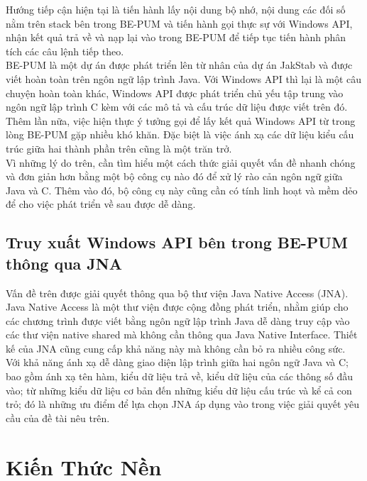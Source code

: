 \documentclass[14pt]{hcmutarticle}
\begin{document}
Hướng tiếp cận hiện tại là tiến hành lấy nội dung bộ nhớ, nội dung các đối số nằm trên stack bên trong BE-PUM và tiến hành gọi thực sự với Windows API, nhận kết quả trả về và nạp lại vào trong BE-PUM để tiếp tục tiến hành phân tích các câu lệnh tiếp theo.\\

BE-PUM là một dự án được phát triển lên từ nhân của dự án JakStab và được viết hoàn toàn trên ngôn ngữ lập trình Java. Với Windows API thì lại là một câu chuyện hoàn toàn khác, Windows API được phát triển chủ yếu tập trung vào ngôn ngữ lập trình C kèm với các mô tả và cấu trúc dữ liệu được viết trên đó. Thêm lần nữa, việc hiện thực ý tưởng gọi để lấy kết quả Windows API từ trong lòng BE-PUM gặp nhiều khó khăn. Đặc biệt là việc ánh xạ các dữ liệu kiểu cấu trúc giữa hai thành phần trên cũng là một trăn trở.\\

Vì những lý do trên, cần tìm hiểu một cách thức giải quyết vấn đề nhanh chóng và đơn giản hơn bằng một bộ công cụ nào đó để xử lý rào cản ngôn ngữ giữa Java và C. Thêm vào đó, bộ công cụ này cũng cần có tính linh hoạt và mềm dẻo để cho việc phát triển về sau được dễ dàng.\\



\section{Truy xuất Windows API bên trong BE-PUM thông qua JNA}

Vấn đề trên được giải quyết thông qua bộ thư viện Java Native Access (JNA).\\

Java Native Access là một thư viện được cộng đồng phát triển, nhằm giúp cho các chương trình được viết bằng ngôn ngữ lập trình Java dễ dàng truy cập vào các thư viện native shared mà không cần thông qua Java Native Interface. Thiết kế của JNA cũng cung cấp khả năng này mà không cần bỏ ra nhiều công sức.\\

Với khả năng ánh xạ dễ dàng giao diện lập trình giữa hai ngôn ngữ Java và C; bao gồm ánh xạ tên hàm, kiểu dữ liệu trả về, kiểu dữ liệu của các thông số đầu vào; từ những kiểu dữ liệu cơ bản đến những kiểu dữ liệu cấu trúc và kể cả con trỏ; đó là những ưu điểm để lựa chọn JNA áp dụng vào trong việc giải quyết yêu cầu của đề tài nêu trên.



\chapter{Kiến Thức Nền}
\end{document}
